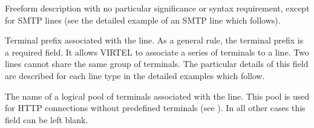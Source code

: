 \documentclass[letterpaper,10pt,english]{sphinxmanual}
\begin{document}
\begin{description}
\begin{sphinxVerbatim}[commandchars=\\\{\}]
     
 
 


     
 
 
\end{sphinxVerbatim}

\sphinxAtStartPar
Free\sphinxhyphen{}form description with no particular significance or syntax requirement, except for SMTP lines (see the detailed example of an SMTP line which follows).

\sphinxAtStartPar
Terminal prefix associated with the line. As a general rule, the terminal prefix is a required field. It allows VIRTEL to associate a series of terminals to a line. Two lines cannot share the same group of terminals. The particular details of this field are described for each line type in the detailed examples which follow.

\sphinxAtStartPar
The name of a logical pool of terminals associated with the line. This pool is used for HTTP connections without predefined terminals
(see {\hyperref[\detokenize{connectivity_guide:v461cn-forceluname}]{}}). In all other cases this field can be left blank.


\end{description}
\end{document}
